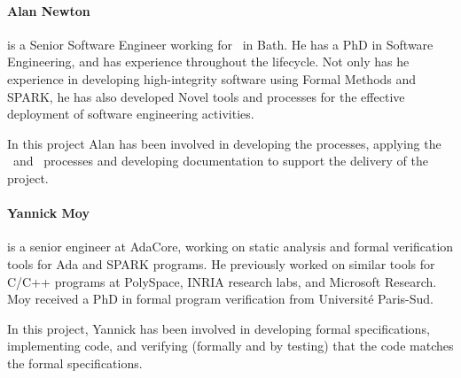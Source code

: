 \paragraph{Alan Newton}\label{AlanNewton} is a Senior Software Engineer
working for \altran\ in Bath. He has a PhD in Software Engineering,
and has experience throughout the lifecycle. Not only has he
experience in developing high-integrity software using Formal Methods
and SPARK, he has also developed Novel tools and processes for the
effective deployment of software engineering activities.

In this project Alan has been involved in developing the processes,
applying the \reveal\ and \informed\ processes and developing
documentation to support the delivery of the project.

\paragraph{Yannick Moy}\label{YannickMoy}
is a senior engineer at AdaCore, working on static
analysis and formal verification tools for Ada and SPARK programs. He
previously worked on similar tools for C/C++ programs at PolySpace,
INRIA research labs, and Microsoft Research. Moy received a PhD in
formal program verification from Université Paris-Sud.

In this project, Yannick has been involved in developing formal
specifications, implementing code, and verifying (formally and by testing)
that the code matches the formal specifications.
